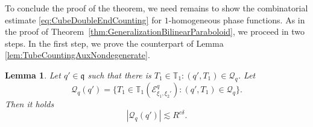 \documentclass{amsart}
\newtheorem{lemma}[theorem]{Lemma}
\theoremstyle{definition}
\newcommand{\T}{\mathbb{T}}
\begin{document}
To conclude the proof of the theorem, we need remains to show the combinatorial estimate \eqref{eq:CubeDoubleEndCounting} for $1$-homogeneous phase functions. As in the proof of Theorem~\ref{thm:GeneralizationBilinearParaboloid}, we proceed in two steps. In the first step, we prove the counterpart of Lemma \ref{lem:TubeCountingAuxNondegenerate}.
\begin{lemma}
\label{lem:TubeCountingAuxNondegenerateCone}
Let $q' \in \mathfrak{q}$ such that there is $T_1 \in \T_1 : (q',T_1) \in \mathcal{Q}_{q}$. Let
\begin{equation*}
\mathcal{Q}_{q}(q') = \{ T_1 \in \T_1(\mathcal{E}^{q}_{\xi_1,\xi_2'}) : (q',T_1) \in \mathcal{Q}_{q} \}.
\end{equation*}
Then it holds
\begin{equation*}
|\mathcal{Q}_{q}(q')| \lesssim R^{c \delta}.
\end{equation*}
\end{lemma}
\end{document}
